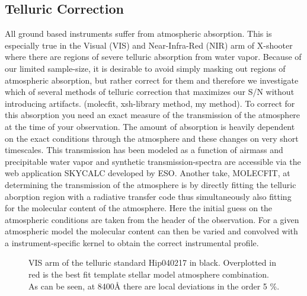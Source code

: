 \documentclass[iop]{emulateapj}
\begin{document}
\subsection{Telluric Correction}
All ground based instruments suffer from atmospheric absorption. This is especially true in the Visual (VIS) and Near-Infra-Red (NIR) arm of X-shooter where there are regions of severe telluric absorption from water vapor.  Because of our limited sample-size, it is desirable to avoid simply masking out regions of atmospheric absorption, but rather correct for them and therefore we investigate which of several methods of telluric correction that maximizes our S/N without introducing artifacts. (molecfit, xsh-library method, my method). To correct for this absorption you need an exact measure of the transmission of the atmosphere at the time of your observation. The amount of absorption is heavily dependent on the exact conditions through the atmosphere and these changes on very short timescales. This transmission has been modeled as a function of airmass and precipitable water vapor and synthetic transmission-spectra are accessible via the web application SKYCALC developed by ESO.  Another take, MOLECFIT, at determining the transmission of the atmosphere is by directly fitting the telluric aborption region with a radiative transfer code thus simultaneously also fitting for the molecular content of the atmosphere. Here the initial guess on the atmospheric conditions are taken from the header of the observation. For a given atmospheric model the molecular content can then be varied and convolved with a instrument-specific kernel to obtain the correct instrumental profile. \\

\begin{figure}
\caption{VIS arm of the telluric standard Hip040217 in black. Overplotted in red is the best fit template stellar model atmosphere combination. As can be seen, at 8400\r{A}  there are local deviations in the order 5 \%.\label{tellqc}}
\end{figure}
\end{document}
